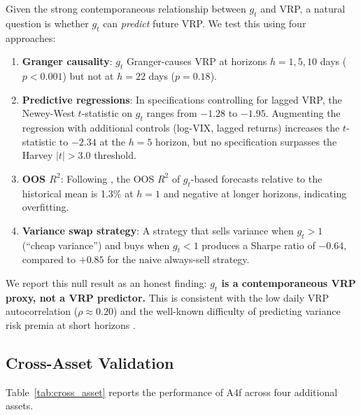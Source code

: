 \documentclass[12pt,a4paper]{article}
\begin{document}
Given the strong contemporaneous relationship between $g_t$ and VRP, a natural question is whether $g_t$ can \emph{predict} future VRP. We test this using four approaches:

\begin{enumerate}
\item \textbf{Granger causality}: $g_t$ Granger-causes VRP at horizons $h = 1, 5, 10$ days ($p < 0.001$) but not at $h = 22$ days ($p = 0.18$).

\item \textbf{Predictive regressions}: In specifications controlling for lagged VRP, the Newey-West $t$-statistic on $g_t$ ranges from $-1.28$ to $-1.95$. Augmenting the regression with additional controls (log-VIX, lagged returns) increases the $t$-statistic to $-2.34$ at the $h=5$ horizon, but no specification surpasses the Harvey $|t| > 3.0$ threshold.

\item \textbf{OOS $R^2$}: Following \citet{campbell2008}, the OOS $R^2$ of $g_t$-based forecasts relative to the historical mean is 1.3\% at $h=1$ and negative at longer horizons, indicating overfitting.

\item \textbf{Variance swap strategy}: A strategy that sells variance when $g_t > 1$ (``cheap variance'') and buys when $g_t < 1$ produces a Sharpe ratio of $-0.64$, compared to $+0.85$ for the naive always-sell strategy.
\end{enumerate}

We report this null result as an honest finding: \textbf{$g_t$ is a contemporaneous VRP proxy, not a VRP predictor.} This is consistent with the low daily VRP autocorrelation ($\rho \approx 0.20$) and the well-known difficulty of predicting variance risk premia at short horizons \citep{bollerslev2009}.


\subsection{Cross-Asset Validation}
\label{sec:cross_asset}

Table~\ref{tab:cross_asset} reports the performance of A4f across four additional assets.
\end{document}
